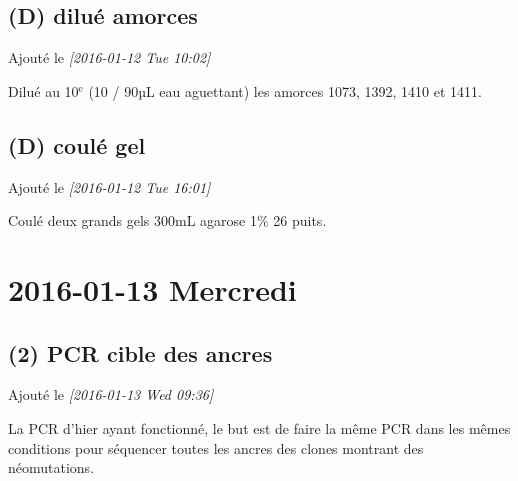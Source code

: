\documentclass[9pt, oneside, twocolumn]{scrartcl}
\begin{document}
\subsection{(D) dilué amorces}
\label{sec:orgheadline16}
Ajouté le \textit{[2016-01-12 Tue 10:02]}

Dilué au 10\(^{\text{e}}\) (10 / 90µL eau aguettant) les amorces 1073, 1392, 1410 et 1411.

\subsection{(D) coulé gel}
\label{sec:orgheadline17}
Ajouté le \textit{[2016-01-12 Tue 16:01]}

Coulé deux grands gels 300mL agarose 1\% 26 puits.
\section{2016-01-13 Mercredi}
\label{sec:orgheadline29}
\subsection{(2) PCR cible des ancres}
\label{sec:orgheadline23}
Ajouté le \textit{[2016-01-13 Wed 09:36]}

La PCR d'hier ayant fonctionné, le but est de faire la même PCR dans les mêmes
conditions pour séquencer toutes les ancres des clones montrant des
néomutations. 
\end{document}
